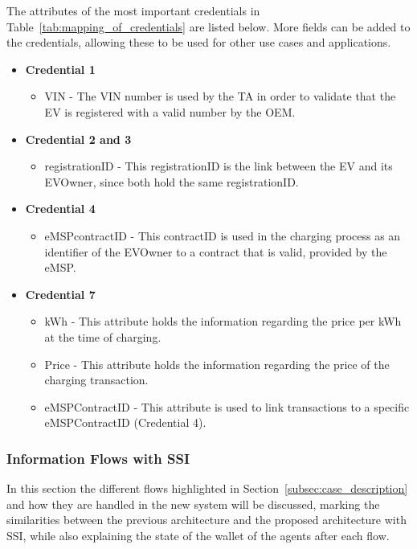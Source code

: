 The attributes of the most important credentials in Table~\ref{tab:mapping_of_credentials} are listed below. More fields can be added to the credentials, allowing these to be used for other use cases and applications.

\begin{itemize}
    \item \textbf{Credential 1}
    \begin{itemize}
        \item VIN - The VIN number is used by the TA in order to validate that the EV is registered with a valid number by the OEM.
    \end{itemize}
    \item \textbf{Credential 2 and 3}
    \begin{itemize}
        \item registrationID - This registrationID is the link between the EV and its EVOwner, since both hold the same registrationID.
    \end{itemize}
    \item \textbf{Credential 4}
    \begin{itemize}
        \item eMSPcontractID - This contractID is used in the charging process as an identifier of the EVOwner to a contract that is valid, provided by the eMSP.
    \end{itemize}
    \item \textbf{Credential 7}
    \begin{itemize}
        \item kWh - This attribute holds the information regarding the price per kWh at the time of charging.
        \item Price - This attribute holds the information regarding the price of the charging transaction.
        \item eMSPContractID - This attribute is used to link transactions to a specific eMSPContractID (Credential 4).
    \end{itemize}
\end{itemize}

\subsubsection{Information Flows with SSI}
\label{subsubsec:information-flows-ssi}

In this section the different flows highlighted in Section~\ref{subsec:case_description} and how they are handled in the new system will be discussed, marking the similarities between the previous architecture and the proposed architecture with SSI, while also explaining the state of the wallet of the agents after each flow.

